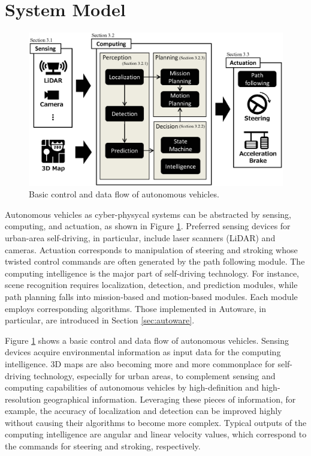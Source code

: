 \section{System Model}
\label{sec:system_model}

\begin{figure}[!htbp]
  \centering
  \includegraphics[width=0.6\linewidth]{../figure/system_model.eps}
  \caption{\label{fig:system_model}
    Basic control and data flow of autonomous vehicles.}
\end{figure}

Autonomous vehicles as cyber-physycal systems can be abstracted by
sensing, computing, and actuation, as shown in Figure
\ref{fig:system_model}.
Preferred sensing devices for urban-area self-driving, in particular,
include laser scanners (LiDAR) and cameras.
Actuation corresponds to manipulation of steering and stroking whose
twisted control commands are often generated by the path following module.
The computing intelligence is the major part of self-driving technology.
For instance, scene recognition requires localization, detection, and
prediction modules, while path planning falls into mission-based and
motion-based modules.
Each module employs corresponding algorithms.
Those implemented in Autoware, in particular, are introduced in Section
\ref{sec:autoware}.

Figure \ref{fig:system_model} shows a basic control and data flow of
autonomous vehicles.
Sensing devices acquire environmental information as input data for the
computing intelligence.
3D maps are also becoming more and more commonplace for self-driving
technology, especially for urban areas, to complement sensing and
computing capabilities of autonomous vehicles by high-definition and
high-resolution geographical information.
Leveraging these pieces of information, for example, the accuracy of
localization and detection can be improved highly without causing their
algorithms to become more complex.
Typical outputs of the computing intelligence are angular and linear
velocity values, which correspond to the commands for steering and
stroking, respectively.

